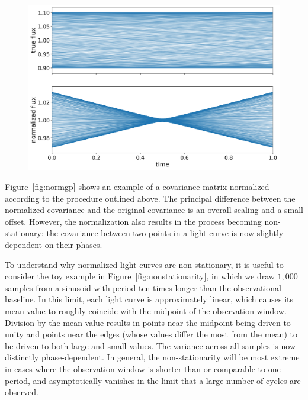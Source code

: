 \documentclass[modern]{aastex62}
\begin{document}
\begin{figure}[p!]
    \begin{centering}
        \includegraphics[width=\linewidth]{figures/nonstationarity.pdf}
    \end{centering}
\end{figure}

Figure~\ref{fig:normgp} shows an example of a covariance matrix normalized
according to the procedure outlined above. The principal difference between
the normalized covariance and the original covariance is an overall
scaling and a small offset. However, the normalization also results in
the process becoming non-stationary: the covariance between two points in
a light curve is now slightly dependent on their phases.

To understand why normalized light curves are non-stationary, it is useful to
consider the
toy example in Figure~\ref{fig:nonstationarity}, in which we draw
$1{,}000$ samples from a sinusoid with period ten times longer than the
observational baseline. In this limit, each light curve is approximately
linear, which causes its mean value to roughly coincide with the midpoint of the
observation window. Division by the mean value results in points near the
midpoint being driven to unity and points near the edges (whose values differ
the most from the mean) to be driven to both large and small values. The
variance across all samples is now distinctly phase-dependent.
%
In general, the non-stationarity will be most extreme in cases where the
observation window is shorter than or comparable to one period, and
asymptotically vanishes in the limit that a large number of cycles are
observed.
\end{document}
